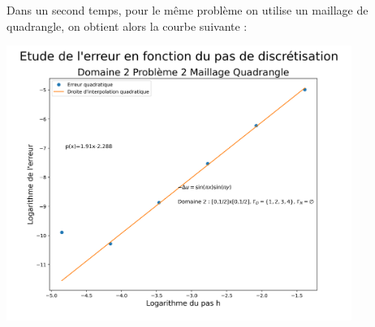 \documentclass[a4paper, 12pt, french]{report}
\begin{document}
Dans un second temps, pour le même problème on utilise un maillage de quadrangle, on obtient alors la courbe suivante :
\begin{center}
    \includegraphics[height=9cm]{../Images/Courbes_Erreurs/D2P2Q.png}
\end{center}
\end{document}
